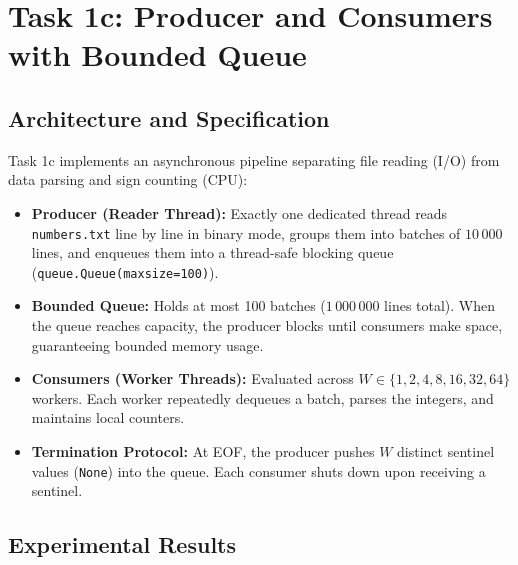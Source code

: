 \documentclass{labreport}
\begin{document}
\newpage

\section{Task 1c: Producer and Consumers with Bounded Queue}

\subsection{Architecture and Specification}
Task 1c implements an asynchronous pipeline separating file reading (I/O) from data parsing and sign counting (CPU):
\begin{itemize}
    \item \textbf{Producer (Reader Thread):} Exactly one dedicated thread reads \texttt{numbers.txt} line by line in binary mode, groups them into batches of $10\,000$ lines, and enqueues them into a thread-safe blocking queue (\texttt{queue.Queue(maxsize=100)}).
    \item \textbf{Bounded Queue:} Holds at most 100 batches ($1\,000\,000$ lines total). When the queue reaches capacity, the producer blocks until consumers make space, guaranteeing bounded memory usage.
    \item \textbf{Consumers (Worker Threads):} Evaluated across $W \in \{1, 2, 4, 8, 16, 32, 64\}$ workers. Each worker repeatedly dequeues a batch, parses the integers, and maintains local counters.
    \item \textbf{Termination Protocol:} At EOF, the producer pushes $W$ distinct sentinel values (\texttt{None}) into the queue. Each consumer shuts down upon receiving a sentinel.
\end{itemize}

\subsection{Experimental Results}
\end{document}
